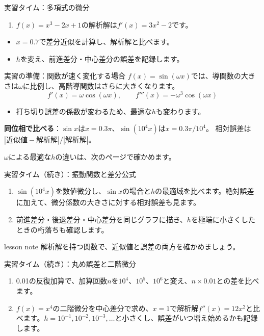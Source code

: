 \documentclass[12pt,aspectratio=43]{beamer}
\newenvironment{lessonbox}
  {\begin{beamercolorbox}[wd=\linewidth,sep=1.5mm]{lesson note}}
  {\end{beamercolorbox}\par}
\begin{document}
\begin{frame}[t]{実習タイム：多項式の微分}
  \setlength{\parskip}{0pt}
  \vspace*{\fill}
  \begin{enumerate}
    \item $f(x)=x^3-2x+1$の解析解は$f'(x)=3x^2-2$です。
  \end{enumerate}
  \begin{itemize}
    \item $x=0.7$で差分近似を計算し、解析解と比べます。
    \item $h$を変え、前進差分・中心差分の誤差を記録します。
  \end{itemize}
  \vfill
\end{frame}

\begin{frame}[t]{実習の準備：関数が速く変化する場合}
  \setlength{\parskip}{0.5mm}
  $f(x)=\sin(\omega x)$では、導関数の大きさは$\omega$に比例し、高階導関数はさらに大きくなります。
  \[
    f'(x)=\omega\cos(\omega x),\qquad f'''(x)=-\omega^3\cos(\omega x)
  \]
  \begin{itemize}
    \item 打ち切り誤差の係数が変わるため、最適な$h$も変わります。
  \end{itemize}
  \vspace{1mm}
  \textbf{同位相で比べる}：$\sin x$は$x=0.3\pi$、$\sin(10^4x)$は$x=0.3\pi/10^4$。
  相対誤差は$|\text{近似値}-\text{解析解}|/|\text{解析解}|$。
  \vspace{0.5mm}

  $\omega$による最適な$h$の違いは、次のページで確かめます。
\end{frame}

\begin{frame}[t]{実習タイム（続き）：振動関数と差分公式}
  \begin{enumerate}
    \setlength{\itemsep}{4mm}
    \setcounter{enumi}{1}
    \item $\sin(10^4x)$を数値微分し、$\sin x$の場合と$h$の最適域を比べます。絶対誤差に加えて、微分係数の大きさに対する相対誤差も見ます。
    \item 前進差分・後退差分・中心差分を同じグラフに描き、$h$を極端に小さくしたときの桁落ちも確認します。
  \end{enumerate}
  \vfill
  \begin{lessonbox}
    解析解を持つ関数で、近似値と誤差の両方を確かめましょう。
  \end{lessonbox}
\end{frame}

\begin{frame}[t]{実習タイム（続き）：丸め誤差と二階微分}
  \begin{enumerate}
    \setlength{\itemsep}{4mm}
    \setcounter{enumi}{3}
    \item 0.01の反復加算で、加算回数$n$を$10^4$、$10^5$、$10^6$と変え、$n\times0.01$との差を比べます。
    \item $f(x)=x^4$の二階微分を中心差分で求め、$x=1$で解析解$f''(x)=12x^2$と比べます。$h=10^{-1},10^{-2},10^{-3},\ldots$と小さくし、誤差がいつ増え始めるかも記録します。
  \end{enumerate}
\end{frame}
\end{document}
